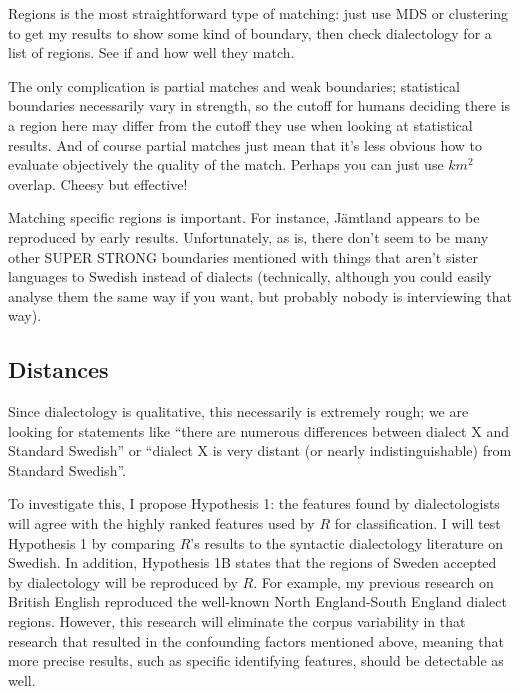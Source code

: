 Regions is the most straightforward type of matching: just use MDS or
clustering to get my results to show some kind of boundary, then check
dialectology for a list of regions. See if and how well they match.

The only complication is partial matches and weak boundaries;
statistical boundaries necessarily vary in strength, so the cutoff for
humans deciding there is a region here may differ from the cutoff they
use when looking at statistical results. And of course partial matches
just mean that it's less obvious how to evaluate objectively the
quality of the match. Perhaps you can just use $km^2$ overlap. Cheesy
but effective!

Matching specific regions is important. For instance, J\"amtland
appears to be reproduced by early results. Unfortunately, as is, there
don't seem to be many other SUPER STRONG boundaries mentioned with
things that aren't sister languages to Swedish instead of dialects
(technically, although you could easily analyse them the same way if
you want, but probably nobody is interviewing that way).

\subsection{Distances}

Since dialectology is qualitative, this necessarily is extremely
rough; we are looking for statements like ``there are numerous
differences between dialect X and Standard Swedish'' or ``dialect X is
very distant (or nearly indistinguishable) from Standard Swedish''.

To investigate this, I propose Hypothesis 1: the features found by
dialectologists will agree with the highly ranked features used by $R$
for classification. I will test Hypothesis 1 by comparing $R$'s
results to the syntactic dialectology literature on Swedish. In
addition, Hypothesis 1B states that the regions of Sweden accepted by
dialectology will be reproduced by $R$. For example, my
previous research on British English reproduced the well-known North
England-South England dialect regions. However, this research will eliminate the
corpus variability in that research \cite{sanders08b} that resulted in
the confounding factors mentioned above, meaning that more precise
results, such as specific identifying features, should be detectable as well.

